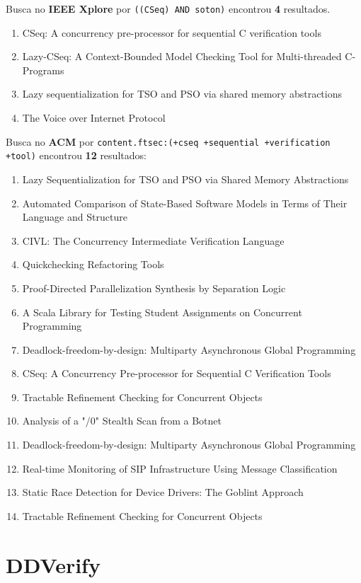 Busca no {\bf IEEE Xplore} por
\texttt{((CSeq) AND soton)}
encontrou {\bf 4}
resultados.

\begin{enumerate}
\item CSeq: A concurrency pre-processor for sequential C verification tools
\item Lazy-CSeq: A Context-Bounded Model Checking Tool for Multi-threaded C-Programs
\item Lazy sequentialization for TSO and PSO via shared memory abstractions
\item The Voice over Internet Protocol
\end{enumerate}

Busca no {\bf ACM} por
\texttt{content.ftsec:(+cseq +sequential +verification +tool)}
encontrou {\bf 12}
resultados:

\begin{enumerate}
\item Lazy Sequentialization for TSO and PSO via Shared Memory Abstractions
\item Automated Comparison of State-Based Software Models in Terms of Their Language and Structure
\item CIVL: The Concurrency Intermediate Verification Language
\item Quickchecking Refactoring Tools
\item Proof-Directed Parallelization Synthesis by Separation Logic
\item A Scala Library for Testing Student Assignments on Concurrent Programming
\item Deadlock-freedom-by-design: Multiparty Asynchronous Global Programming
\item CSeq: A Concurrency Pre-processor for Sequential C Verification Tools
\item Tractable Refinement Checking for Concurrent Objects
\item Analysis of a "/0" Stealth Scan from a Botnet
\item Deadlock-freedom-by-design: Multiparty Asynchronous Global Programming
\item Real-time Monitoring of SIP Infrastructure Using Message Classification
\item Static Race Detection for Device Drivers: The Goblint Approach
\item Tractable Refinement Checking for Concurrent Objects
\end{enumerate}

\section{DDVerify}

